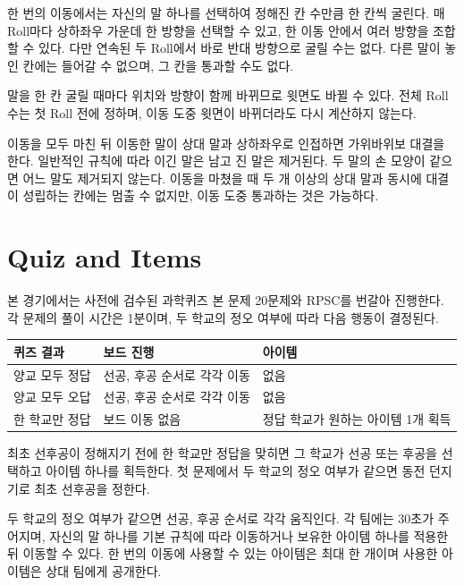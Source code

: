 한 번의 이동에서는 자신의 말 하나를 선택하여 정해진 칸 수만큼 한 칸씩 굴린다. 매 Roll마다 상하좌우 가운데 한 방향을 선택할 수 있고, 한 이동 안에서 여러 방향을 조합할 수 있다. 다만 연속된 두 Roll에서 바로 반대 방향으로 굴릴 수는 없다. 다른 말이 놓인 칸에는 들어갈 수 없으며, 그 칸을 통과할 수도 없다.

말을 한 칸 굴릴 때마다 위치와 방향이 함께 바뀌므로 윗면도 바뀔 수 있다. 전체 Roll 수는 첫 Roll 전에 정하며, 이동 도중 윗면이 바뀌더라도 다시 계산하지 않는다.

이동을 모두 마친 뒤 이동한 말이 상대 말과 상하좌우로 인접하면 가위바위보 대결을 한다. 일반적인 규칙에 따라 이긴 말은 남고 진 말은 제거된다. 두 말의 손 모양이 같으면 어느 말도 제거되지 않는다. 이동을 마쳤을 때 두 개 이상의 상대 말과 동시에 대결이 성립하는 칸에는 멈출 수 없지만, 이동 도중 통과하는 것은 가능하다.

\section{Quiz and Items}

본 경기에서는 사전에 검수된 과학퀴즈 본 문제 20문제와 RPSC를 번갈아 진행한다. 각 문제의 풀이 시간은 1분이며, 두 학교의 정오 여부에 따라 다음 행동이 결정된다.

\begin{center}\renewcommand{\arraystretch}{1.18}\begin{tabular}{@{}L{0.24\textwidth}L{0.28\textwidth}L{0.34\textwidth}@{}}\toprule
퀴즈 결과 & 보드 진행 & 아이템 \\\midrule
양교 모두 정답 & 선공, 후공 순서로 각각 이동 & 없음 \\
양교 모두 오답 & 선공, 후공 순서로 각각 이동 & 없음 \\
한 학교만 정답 & 보드 이동 없음 & 정답 학교가 원하는 아이템 1개 획득 \\\bottomrule
\end{tabular}\end{center}

최초 선후공이 정해지기 전에 한 학교만 정답을 맞히면 그 학교가 선공 또는 후공을 선택하고 아이템 하나를 획득한다. 첫 문제에서 두 학교의 정오 여부가 같으면 동전 던지기로 최초 선후공을 정한다.

두 학교의 정오 여부가 같으면 선공, 후공 순서로 각각 움직인다. 각 팀에는 30초가 주어지며, 자신의 말 하나를 기본 규칙에 따라 이동하거나 보유한 아이템 하나를 적용한 뒤 이동할 수 있다. 한 번의 이동에 사용할 수 있는 아이템은 최대 한 개이며 사용한 아이템은 상대 팀에게 공개한다.

